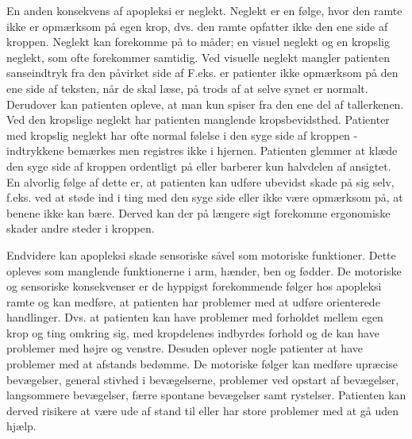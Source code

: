 En anden konsekvens af apopleksi er neglekt. Neglekt er en følge, hvor den ramte ikke er opmærksom på egen krop, dvs. den ramte opfatter ikke den ene side af kroppen. Neglekt kan forekomme på to måder; en visuel neglekt og en kropslig neglekt, som ofte forekommer samtidig. Ved visuelle neglekt mangler patienten sanseindtryk fra den påvirket side af F.eks. er patienter ikke opmærksom på den ene side af teksten, når de skal læse, på trods af at selve synet er normalt. Derudover kan patienten opleve, at man kun spiser fra den ene del af tallerkenen. Ved den kropslige neglekt har patienten manglende kropsbevidsthed. Patienter med kropslig neglekt har ofte normal følelse i den syge side af kroppen - indtrykkene bemærkes men registres ikke i hjernen. Patienten glemmer at klæde den syge side af kroppen ordentligt på eller barberer kun halvdelen af ansigtet. En alvorlig følge af dette er, at patienten kan udføre ubevidst skade på sig selv, f.eks. ved at støde ind i ting med den syge side eller ikke være opmærksom på, at benene ikke kan bære. Derved kan der på længere sigt forekomme ergonomiske skader andre steder i kroppen. \citep{Sundhed.dk} %

Endvidere kan apopleksi skade sensoriske såvel som motoriske funktioner. Dette opleves som manglende funktionerne i arm, hænder, ben og fødder. De motoriske og sensoriske konsekvenser er de hyppigst forekommende følger hos apopleksi ramte og kan medføre, at patienten har problemer med at udføre orienterede handlinger. Dvs. at patienten kan have problemer med forholdet mellem egen krop og ting omkring sig, med kropdelenes indbyrdes forhold og de kan have problemer med højre og venstre. Desuden oplever nogle patienter at have problemer med at afstands bedømme. De motoriske følger kan medføre upræcise bevægelser, general stivhed i bevægelserne, problemer ved opstart af bevægelser, langsommere bevægelser, færre spontane bevægelser samt rystelser. Patienten kan derved risikere at være ude af stand til eller har store problemer med at gå uden hjælp.\citep{Sundhed.dk} \citep{DSfA2009}

